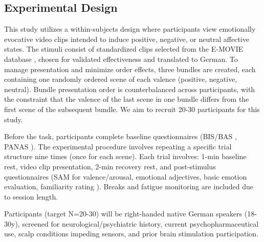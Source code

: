 \documentclass[12pt]{article} %
\begin{document}
\subsection{Experimental Design}
This study utilizes a within-subjects design where participants view emotionally evocative video clips intended to induce positive, negative, or neutral affective states. The stimuli consist of standardized clips selected from the E-MOVIE database \parencite{maffeiEMOVIEExperimentalMOVies2019}, chosen for validated effectiveness and translated to German. To manage presentation and minimize order effects, three bundles are created, each containing one randomly ordered scene of each valence (positive, negative, neutral). Bundle presentation order is counterbalanced across participants, with the constraint that the valence of the last scene in one bundle differs from the first scene of the subsequent bundle. We aim to recruit 20-30 participants for this study.

Before the task, participants complete baseline questionnaires (\gls{BIS}/\gls{BAS} \parencite{carverBehavioralInhibitionBehavioral1994, strobelDeutschsprachigeVersionBIS2006}, \gls{PANAS} \parencite{watsonDevelopmentValidationBrief1988,breyerDeutscheVersionPositive2016}). The experimental procedure involves repeating a specific trial structure nine times (once for each scene). Each trial involves: 1-min baseline rest, video clip presentation, 2-min recovery rest, and post-stimulus questionnaires (\gls{SAM} for valence/arousal, emotional adjectives, basic emotion evaluation, familiarity rating \parencite{maffeiEMOVIEExperimentalMOVies2019}). Breaks and fatigue monitoring are included due to session length.

Participants (target N=20-30) will be right-handed native German speakers (18-30y), screened for neurological/psychiatric history, current psychopharmaceutical use, scalp conditions impeding sensors, and prior brain stimulation participation.
\end{document}
